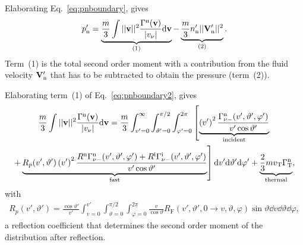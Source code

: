 Elaborating Eq.~\eqref{eq:pnboundary}, gives
\begin{equation}
p_{\mathrm{n}}' = \underbrace{\frac{m}{3} \int ||{\bf v}||^{2} \frac{\Gamma^{\mathrm{n}}({\bf v})}{|v_{\nu}|} \mathrm{d} {\bf v}}_{(1)} - \underbrace{\frac{m}{3} n_{\mathrm{n}}' || {\bf V}_{\mathrm{n}}'||^{2}}_{(2)}. \label{eq:pnboundary2}
\end{equation}
Term~(1) is the total second order moment with a contribution from the fluid velocity ${\bf V}_{\mathrm{n}}'$ that has to be subtracted to obtain the pressure (term~(2)).

Elaborating term~(1) of Eq.~\eqref{eq:pnboundary2}, gives
\begin{multline}
\frac{m}{3} \int ||{\bf v}||^{2} \frac{\Gamma^{\mathrm{n}}({\bf v})}{|v_{\nu}|} \mathrm{d} {\bf v} = \frac{m}{3} \int_{v'=0}^{\infty} \int_{\vartheta'=0}^{\pi/2} \int_{\varphi'=0}^{2\pi} \left [ \underbrace{\left (v'\right )^{2} \frac{\Gamma_{\nu-}^{\mathrm{n}}(v',\vartheta',\varphi')}{v' \cos \vartheta'}}_{\text{incident}} \right.  \\
\left. + \underbrace{R_{p}(v',\vartheta') \left (v' \right )^{2}  \frac{R^{\mathrm{n}} \Gamma_{\nu-}^{\mathrm{n}}(v',\vartheta',\varphi') + R^{\mathrm{i}} \Gamma_{\nu-}^{\mathrm{i}}(v',\vartheta',\varphi')}{v' \cos \vartheta'}}_{\text{fast}} \right ] \mathrm{d} v' \mathrm{d} \vartheta' \mathrm{d} \varphi' + \underbrace{\frac{2}{3} m v_{\mathrm{T}} \Gamma_{\mathrm{T}}^{\mathrm{n}}}_{\text{thermal}}, \label{eq:v2fn}
\end{multline}
with
\begin{align}
R_{p}(v',\vartheta') = \frac{\cos \vartheta'}{v'} \int_{v=0}^{v'} \int_{\vartheta=0}^{\pi/2} \int_{\varphi=0}^{2\pi} \frac{v}{\cos \vartheta} R_{\mathrm{F}}(v',\vartheta',0 \rightarrow v,\vartheta,\varphi) \sin \vartheta \dd v \dd \vartheta \dd \varphi, \label{eq:Rp}
\end{align}
a reflection coefficient that determines the second order moment of the distribution after reflection.

